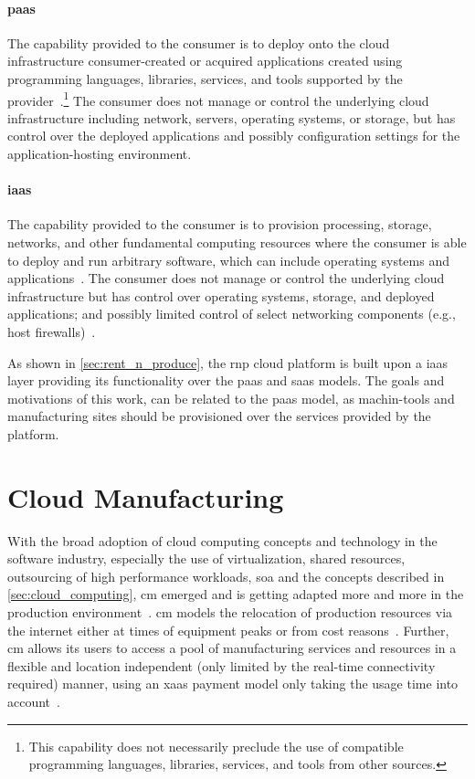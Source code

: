 \documentclass[
a4paper,
twoside,
headsepline,
cleardoublepage=empty,
parskip=half,
draft=false
]{scrbook}
\begin{document}
			\paragraph{\gls{paas}} The capability provided to the consumer is to deploy onto the cloud infrastructure consumer-created or acquired applications created using programming languages, libraries, services, and tools supported by the provider~\cite{fehling2014cloud}.\footnote{This capability does not necessarily preclude the use of compatible programming languages, libraries, services, and tools from other sources.}
			The consumer does not manage or control the underlying cloud infrastructure including network, servers, operating systems, or storage, but has control over the deployed applications and possibly configuration settings for the application-hosting environment.

			\paragraph{\gls{iaas}} The capability provided to the consumer is to provision processing, storage, networks, and other fundamental computing resources where the consumer is able to deploy and run arbitrary software, which can include operating systems and applications~\cite{leymann2011cloud}. The consumer does not manage or control the underlying cloud infrastructure but has control over operating systems, storage, and deployed applications; and possibly limited control of select networking components (e.g., host firewalls)~\cite{mell2011nist}.

			As shown in \cref{sec:rent_n_produce}, the \gls{rnp} cloud platform is built upon a \gls{iaas} layer providing its functionality over the \gls{paas} and \gls{saas} models. The goals and motivations of this work, can be related to the \gls{paas} model, as machin-tools and manufacturing sites should be provisioned over the services provided by the platform.

		\section{Cloud Manufacturing}\label{sec:cloud_manufacturing}

			With the broad adoption of cloud computing concepts and technology in the software industry, especially the use of virtualization, shared resources, outsourcing of high performance workloads, \gls{soa} and the concepts described in \cref{sec:cloud_computing}, \gls{cm} emerged and is getting adapted more and more in the production environment~\cite{he2015state}. \gls{cm} models the relocation of production resources via the internet either at times of equipment peaks or from cost reasons~\cite{wu2013cloud}. Further, \gls{cm} allows its users to access a pool of manufacturing services and resources in a flexible and location independent (only limited by the real-time connectivity required) manner, using an \gls{xaas} payment model only taking the usage time into account~\cite{macia2012cloud}.
\end{document}
